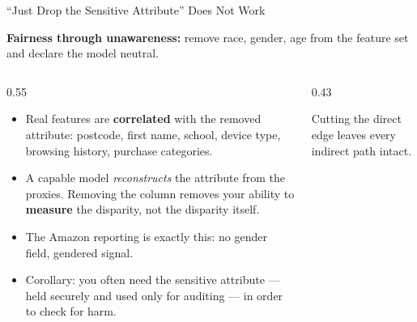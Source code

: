 \begin{frame}{``Just Drop the Sensitive Attribute'' Does Not Work}

    \textbf{Fairness through unawareness:} remove race, gender, age from the feature set and
    declare the model neutral.

    \vspace{0.8em}

    \begin{columns}[T]
        \begin{column}{0.55\textwidth}
            \begin{itemize}\small
                \setlength\itemsep{0.4em}
                \item Real features are \textbf{correlated} with the removed attribute: postcode,
                      first name, school, device type, browsing history, purchase categories.
                \item A capable model \emph{reconstructs} the attribute from the proxies. Removing
                      the column removes your ability to \textbf{measure} the disparity, not the
                      disparity itself.
                \item The Amazon reporting is exactly this: no gender field, gendered signal.
                \item Corollary: you often need the sensitive attribute --- held securely and used
                      only for auditing --- in order to check for harm.
            \end{itemize}
        \end{column}
        \begin{column}{0.43\textwidth}
            \centering
            \vspace{0.2em}
            {\scriptsize Cutting the direct edge leaves every indirect path intact.}
        \end{column}
    \end{columns}
\end{frame}

